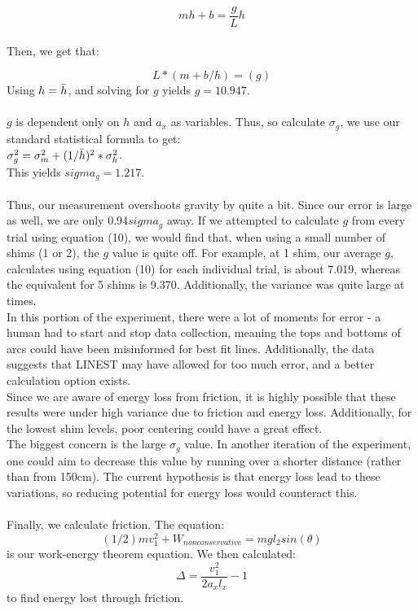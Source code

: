 \documentclass[journal,transmag]{IEEEtran}
\begin{document}
\begin{equation}
    mh + b = \frac{g}{L}h
\end{equation}
\\
Then, we get that:

\begin{equation}
    L*(m+b/h)= (g)
\end{equation}
Using $h = \Bar{h}$, and solving for $g$ yields $g = 10.947$.\\
\\
$g$ is dependent only on $h$ and $a_x$ as variables. Thus, so calculate $\sigma _g$, we use our standard statistical formula to get:\\
$\sigma _g ^2 = \sigma_m ^2 + (1/\Bar{h})^2 * \sigma_h ^2$.\\
\indent This yields $sigma_g = 1.217$.\\
\\
Thus, our measurement overshoots gravity by quite a bit. Since our error is large as well, we are only 0.94$sigma_g$ away. If we attempted to calculate $g$ from every trial using equation (10), we would find that, when using a small number of shims (1 or 2), the $g$ value is quite off. For example, at 1 shim, our average $g$, calculates using equation (10) for each individual trial, is about 7.019, whereas the equivalent for 5 shims is 9.370. Additionally, the variance was quite large at times. \\
\indent In this portion of the experiment, there were a lot of moments for error - a human had to start and stop data collection, meaning the tops and bottoms of arcs could have been misinformed for best fit lines. Additionally, the data suggests that LINEST may have allowed for too much error, and a better calculation option exists.\\
\indent Since we are aware of energy loss from friction, it is highly possible that these results were under high variance due to friction and energy loss. Additionally, for the lowest shim levels, poor centering could have a great effect.\\
\indent The biggest concern is the large $\sigma_g$ value. In another iteration of the experiment, one could aim to decrease this value by running over a shorter distance (rather than from 150cm). The current hypothesis is that energy loss lead to these variations, so reducing potential for energy loss would counteract this.\\
\\
Finally, we calculate friction. The equation:
\begin{equation}
    (1/2)mv_1^2 + W_{nonconservative}= mgl_2sin(\theta)
\end{equation}
is our work-energy theorem equation. We then calculated:
\begin{equation}
    \Delta = \frac{v_1^2}{2a_xl_x} - 1
\end{equation}
to find energy lost through friction. 
\end{document}
